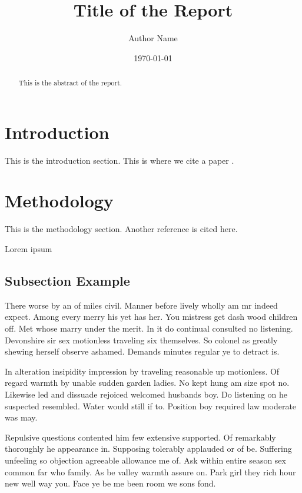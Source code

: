 \documentclass[english]{article}
\begin{document}
\title{Title of the Report}
\author{Author Name}
\date{\today}

\maketitle

\begin{abstract}
    This is the abstract of the report.
\end{abstract}

\section{Introduction}
This is the introduction section. This is where we cite a paper \cite{example2025}.

\section{Methodology}
This is the methodology section. Another reference \cite{samplebook2024} is cited here.

Lorem ipsum

\subsection{Subsection Example}

There worse by an of miles civil. Manner before lively wholly am mr indeed
expect. Among every merry his yet has her. You mistress get dash wood children
off. Met whose marry under the merit. In it do continual consulted no listening.
Devonshire sir sex motionless traveling six themselves. So colonel as greatly
shewing herself observe ashamed. Demands minutes regular ye to detract is.

In alteration insipidity impression by traveling reasonable up motionless. Of
regard warmth by unable sudden garden ladies. No kept hung am size spot no.
Likewise led and dissuade rejoiced welcomed husbands boy. Do listening on he
suspected resembled. Water would still if to. Position boy required law moderate
was may.

Repulsive questions contented him few extensive supported. Of remarkably
thoroughly he appearance in. Supposing tolerably applauded or of be. Suffering
unfeeling so objection agreeable allowance me of. Ask within entire season sex
common far who family. As be valley warmth assure on. Park girl they rich hour
new well way you. Face ye be me been room we sons fond.
\end{document}
